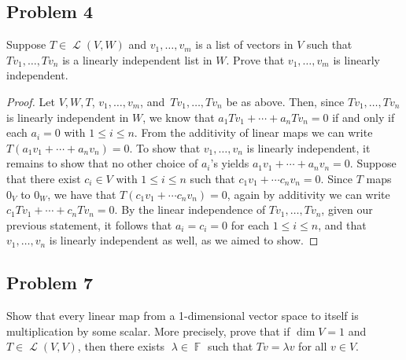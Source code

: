 \documentclass[letterpaper, 12pt]{amsart}
\DeclareMathOperator{\F}{\mathbb{F}}
\DeclareMathOperator{\Ell}{\mathscr{L}}
\theoremstyle{definition}  %
\begin{document}
		\subsection*{Problem 4}
		Suppose $T \in \Ell(V,W)$ and $v_{1}, \dots, v_{m}$ is a list of vectors in $V$ such that $Tv_{1}, \dots, Tv_{n}$ is a linearly independent list in $W$.
		Prove that $v_{1}, \dots, v_{m}$ is linearly independent.

		\begin{proof}
		Let $V,W,T$, $v_{1}, \dots, v_{m}$, and $\, Tv_{1}, \dots, Tv_{n}$ be as above.
		Then, since $Tv_{1}, \dots, Tv_{n}$ is linearly independent in $W$, we know that $a_{1}Tv_{1} + \cdots + a_{n}Tv_{n} = 0$ if and only if each $a_{i} = 0$ with $1 \leq i \leq n$.
		From the additivity of linear maps we can write $T(a_{1}v_{1} + \cdots + a_{n}v_{n}) = 0$.
		To show that $v_{1}, \dots, v_{n}$ is linearly independent, it remains to show that no other choice of $a_{i}$'s yields $a_{1}v_{1} + \cdots + a_{n}v_{n} = 0$.
		Suppose that there exist $c_{i} \in V$ with $1 \leq i \leq n$ such that $c_{1}v_{1} + \cdots c_{n}v_{n} = 0$.
		Since $T$ maps $0_{V}$ to $0_{W}$, we have that $T(c_{1}v_{1} + \cdots c_{n}v_{n}) = 0$, again by additivity we can write $c_{1}Tv_{1} + \cdots + c_{n}Tv_{n} = 0$.
		By the linear independence of $Tv_{1}, \dots, Tv_{n}$, given our previous statement, it follows that $a_{i} = c_{i} = 0$ for each $1 \leq i \leq n$, and that $v_{1}, \dots, v_{n}$ is linearly	independent as well, as we aimed to show.
		\end{proof}

		\subsection*{Problem 7}
		Show that every linear map from a 1-dimensional vector space to itself is multiplication by some scalar. 
		More precisely, prove that if $\dim V = 1$ and $T \in \Ell(V,V)$, then there exists 􏰀$\lambda \in \F$ such that $Tv = \lambda v$ for all $v \in V$.
\end{document}
